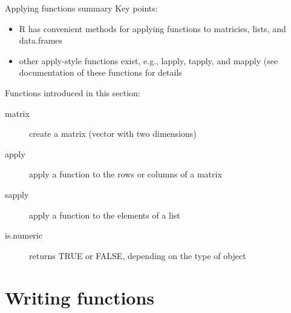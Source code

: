 \documentclass[table,smaller]{beamer}
\begin{document}
\begin{frame}[label=sec-4-4]{Applying functions summary}
Key points:
\begin{itemize}
\item R has convenient methods for applying functions to matricies, lists, and data.frames
\item other apply-style functions exist, e.g., lapply, tapply, and mapply (see documentation of these functions for details
\end{itemize}
Functions introduced in this section: 
\begin{description}
\item[{matrix}] create a matrix (vector with two dimensions)
\item[{apply}] apply a function to the rows or columns of a matrix
\item[{sapply}] apply a function to the elements of a list
\item[{is.numeric}] returns TRUE or FALSE, depending on the type of object
\end{description}
\end{frame}
\section{Writing functions}
\label{sec-5}
\end{document}
